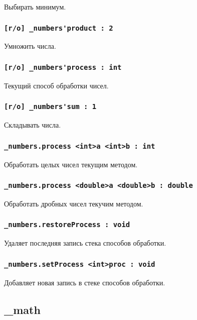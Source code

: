 \documentclass[a4paper, 14pt]{extarticle}
\begin{document}
Выбирать минимум.

\subsubsection{\lstinline|[r/o] _numbers'product : 2|}

Умножить числа.

\subsubsection{\lstinline|[r/o] _numbers'process : int|}

Текущий способ обработки чисел.

\subsubsection{\lstinline|[r/o] _numbers'sum : 1|}

Складывать числа.

\subsubsection{\lstinline|_numbers.process <int>a <int>b : int|}

Обработать целых чисел текущим методом.

\subsubsection{\lstinline|_numbers.process <double>a <double>b : double|}

Обработать дробных чисел текучим методом.

\subsubsection{\lstinline|_numbers.restoreProcess : void|}

Удаляет последняя запись стека способов обработки.

\subsubsection{\lstinline|_numbers.setProcess <int>proc : void|}

Добавляет новая запись в стеке способов обработки.

\subsection{{\color{orange} \_math}}
\end{document}
